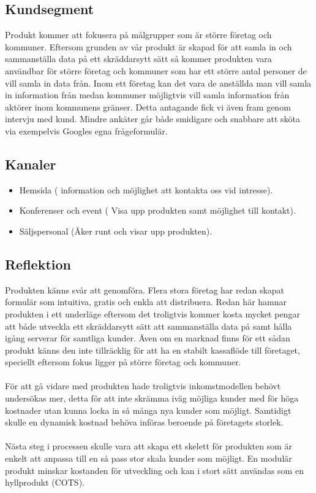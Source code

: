 \documentclass[12pt]{article}
\begin{document}
\subsection{Kundsegment}
Produkt kommer att fokusera på målgrupper som är större företag och kommuner. Eftersom grunden av vår produkt är skapad för att samla in och sammanställa data på ett skräddarsytt sätt så kommer produkten vara användbar för större företag och kommuner som har ett större antal personer de vill samla in data från. Inom ett företag kan det vara de anställda man vill samla in information från medan kommuner möjligtvis vill samla information från aktörer inom kommunens gränser. Detta antagande fick vi även fram genom intervju med kund. Mindre ankäter går både smidigare och snabbare att sköta via exempelvis Googles egna frågeformulär. 

\subsection{Kanaler}
\begin{itemize}
    \item Hemsida ( information och möjlighet att kontakta oss vid intresse).
    \item Konferenser och event ( Visa upp produkten samt möjlighet till kontakt).
    \item Säljspersonal (Åker runt och visar upp produkten).
\end{itemize}


\subsection{Reflektion}
Produkten känns svår att genomföra. Flera stora företag har redan skapat formulär som intuitiva, gratis och enkla att distribuera. Redan här hamnar produkten i ett underläge eftersom det troligtvis kommer kosta mycket pengar att både utveckla ett skräddarsytt sätt att sammanställa data på samt hålla igång serverar för samtliga kunder. Även om en marknad finns för ett sådan produkt känns den inte tillräcklig för att ha en stabilt kassaflöde till företaget, speciellt eftersom fokus ligger på större företag och kommuner. \\\\
För att gå vidare med produkten hade troligtvis inkomstmodellen behövt undersökas mer, detta för att inte skrämma iväg möjliga kunder med för höga kostnader utan kunna locka in så många nya kunder som möjligt. Samtidigt skulle en dynamisk kostnad behöva införas beroende på företagets storlek. \\\\
Nästa steg i processen skulle vara att skapa ett skelett för produkten som är enkelt att anpassa till en så pass stor skala kunder som möjligt. En modulär produkt minskar kostanden för utveckling och kan i stort sätt användas som en hyllprodukt (COTS).


\end{document}
